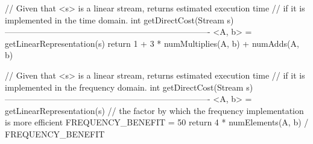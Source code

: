 // Given that <s> is a linear stream, returns estimated execution time
// if it is implemented in the time domain.
int getDirectCost(Stream s)
-------------------------------------------------------------------------
<A, b> = getLinearRepresentation(s)
return 1 + 3 * numMultiplies(A, b) + numAdds(A, b)

// Given that <s> is a linear stream, returns estimated execution time
// if it is implemented in the frequency domain.
int getDirectCost(Stream s)
-------------------------------------------------------------------------
<A, b> = getLinearRepresentation(s)
// the factor by which the frequency implementation is more efficient
FREQUENCY_BENEFIT = 50
return 4 * numElements(A, b) / FREQUENCY_BENEFIT


